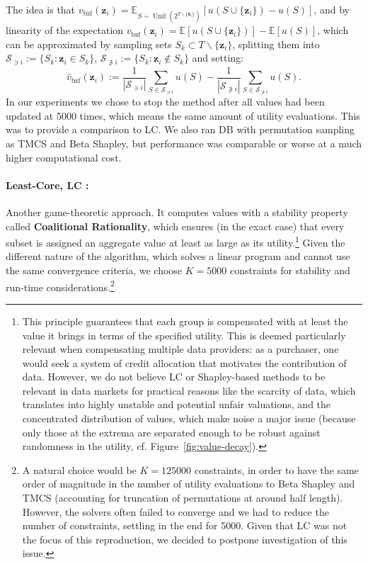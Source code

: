 \documentclass[10pt]{article}
\newcommand{\assign}{:=}
\newcommand{\tmdfn}[1]{\textbf{#1}}
\newcommand{\tmmathbf}[1]{\ensuremath{\boldsymbol{#1}}}
\newcommand{\tmop}[1]{\ensuremath{\operatorname{#1}}}
\newcommand{\nin}{\not\in}
\newcommand{\nni}{\not\ni}
\begin{document}
The idea is that $v_{\tmop{bzf}} (\tmmathbf{z}_i) =\mathbb{E}_{S \sim
\tmop{Unif} (2^{T\backslash \{ \tmmathbf{z}_i \}})} [u (S \cup
\{\tmmathbf{z}_i \}) - u (S)]$, and by linearity of the expectation
$v_{\tmop{bzf}} (\tmmathbf{z}_i) =\mathbb{E} [u (S \cup \{\tmmathbf{z}_i \})]
-\mathbb{E} [u (S)]$, which can be approximated by sampling sets $S_k \subset
T\backslash \{ \tmmathbf{z}_i \}$, splitting them into $\mathcal{S}_{\ni i}
\assign \{ S_k : \tmmathbf{z}_i \in S_k \}$, $\mathcal{S}_{\nni i} \assign \{
S_k : \tmmathbf{z}_i \nin S_k \}$ and setting:
\[ \hat{v}_{\tmop{bzf}} (\tmmathbf{z}_i) \assign \frac{1}{| \mathcal{S}_{\ni
   i} |}  \sum_{S \in \mathcal{S}_{\ni i}} u (S) - \frac{1}{|
   \mathcal{S}_{\nni i} |}  \sum_{S \in \mathcal{S}_{\nni i}} u (S) . \]
In our experiments we chose to stop the method after all values had been
updated at 5000 times, which means the same amount of utility evaluations.
This was to provide a comparison to LC. We also ran DB with permutation
sampling as TMCS and Beta Shapley, but performance was comparable or worse at
a much higher computational cost.

\paragraph{Least-Core, LC {\citep{yan_if_2021}}:}Another game-theoretic
approach. It computes values with a stability property called
{\tmdfn{Coalitional Rationality}}, which ensures (in the exact case) that
every subset is assigned an aggregate value at least as large as its
utility.\footnote{This principle guarantees that each group is compensated
with at least the value it brings in terms of the specified utility. This is
deemed particularly relevant when compensating multiple data providers: as a
purchaser, one would seek a system of credit allocation that motivates the
contribution of data. However, we do not believe LC or Shapley-based methods
to be relevant in data markets for practical reasons like the scarcity of
data, which translates into highly unstable and potential unfair valuations,
and the concentrated distribution of values, which make noise a major issue
(because only those at the extrema are separated enough to be robust against
randomness in the utility, cf.  Figure~\ref{fig:value-decay}).} Given the
different nature of the algorithm, which solves a linear program and cannot
use the same convergence criteria, we choose $K = 5000$ constraints for
stability and run-time considerations.\footnote{A natural choice would be $K =
125000$ constraints, in order to have the same order of magnitude in the
number of utility evaluations to Beta Shapley and TMCS (accounting for
truncation of permutations at around half length). However, the solvers often
failed to converge and we had to reduce the number of constraints, settling in
the end for 5000. Given that LC was not the focus of this reproduction, we
decided to postpone investigation of this issue.}
\end{document}
